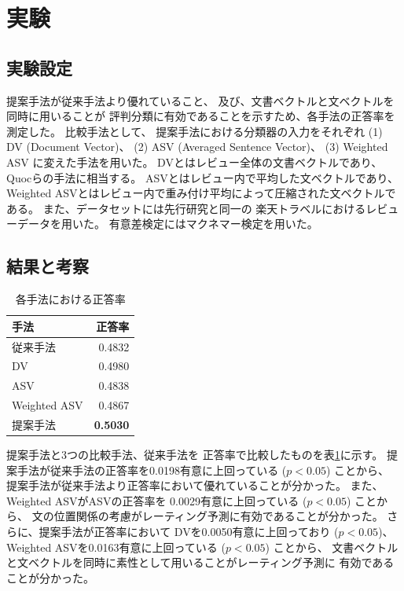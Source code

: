 \documentclass{ttisummary}
\begin{document}
\section{実験}

\subsection{実験設定}

提案手法が従来手法より優れていること、
及び、文書ベクトルと文ベクトルを同時に用いることが
評判分類に有効であることを示すため、各手法の正答率を測定した。
比較手法として、
提案手法における分類器の入力をそれぞれ
(1) DV (Document Vector)、
(2) ASV (Averaged Sentence Vector)、
(3) Weighted ASV
に変えた手法を用いた。
DVとはレビュー全体の文書ベクトルであり、
Quocら\cite{quoc14}の手法に相当する。
ASVとはレビュー内で平均した文ベクトルであり、
Weighted ASVとはレビュー内で重み付け平均によって圧縮された文ベクトルである。
また、データセットには先行研究\cite{fujitani15}と同一の
楽天トラベルにおけるレビューデータを用いた。
有意差検定にはマクネマー検定を用いた。


\subsection{結果と考察}

\begin{table}[b!]
  \caption{各手法における正答率}
  \centering
  \begin{tabular}{l | r} \label{tab:Accuracies}
    手法 & 正答率 \\
    \hline
    従来手法\cite{fujitani15}  & 0.4832 \\
    DV & 0.4980 \\
    ASV & 0.4838 \\
    Weighted ASV & 0.4867 \\
    提案手法 & \textbf{0.5030} \\
  \end{tabular}
\end{table}

提案手法と3つの比較手法、従来手法\cite{fujitani15}を
正答率で比較したものを表\ref{tab:Accuracies}に示す。
提案手法が従来手法の正答率を0.0198有意に上回っている ($p < 0.05$) ことから、
提案手法が従来手法より正答率において優れていることが分かった。
また、Weighted ASVがASVの正答率を
0.0029有意に上回っている ($p < 0.05$) ことから、
文の位置関係の考慮がレーティング予測に有効であることが分かった。
さらに、提案手法が正答率において
DVを0.0050有意に上回っており ($p < 0.05$)、
Weighted ASVを0.0163有意に上回っている ($p < 0.05$) ことから、
文書ベクトルと文ベクトルを同時に素性として用いることがレーティング予測に
有効であることが分かった。
\end{document}
